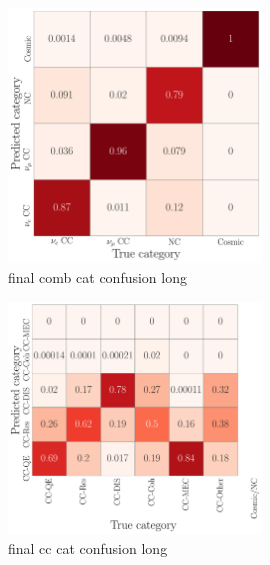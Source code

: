 

\begin{figure} %
    \includegraphics[width=0.6\textwidth]{diagrams/7-cvn/chipsnet/final_comb_cat_confusion.pdf}
    \caption[final comb cat confusion short]
    {final comb cat confusion long}
    \label{fig:final_comb_cat_confusion}
\end{figure}

\begin{figure} %
    \includegraphics[width=0.6\textwidth]{diagrams/7-cvn/chipsnet/final_cc_cat_confusion.pdf}
    \caption[final cc cat confusion short]
    {final cc cat confusion long}
    \label{fig:final_cc_cat_confusion}
\end{figure}

